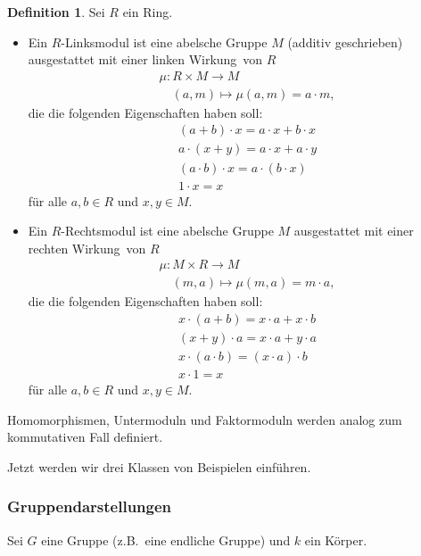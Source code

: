 \documentclass[reqno,12pt]{article}
\numberwithin{equation}{section}
\theoremstyle{plain}
\theoremstyle{definition}
\newtheorem{definition}[thm]{Definition}
\begin{document}
\begin{definition}
Sei $R$ ein Ring.
\begin{itemize}
  \item Ein {\sf $R$-Linksmodul} ist eine abelsche Gruppe $M$ (additiv geschrieben) ausgestattet mit einer linken \glqq Wirkung\grqq\, von $R$
  \begin{align*}
    & \mu \colon R \times M \to M \\
    & \quad  (a,m) \mapsto \mu(a,m) = a \cdot m,
  \end{align*}
  die die folgenden Eigenschaften haben soll:
  \begin{align*}
    & (a+b) \cdot x = a \cdot x + b \cdot x \\
    & a \cdot (x+y) = a \cdot x + a \cdot y \\
    & (a \cdot b) \cdot x = a \cdot (b \cdot x) \\
    & 1 \cdot x = x
  \end{align*}
  für alle $a,b \in R$ und $x,y \in M$.

  \item Ein {\sf $R$-Rechtsmodul} ist eine abelsche Gruppe $M$ ausgestattet mit einer rechten \glqq Wirkung\grqq\, von $R$
    \begin{align*}
      & \mu \colon M \times R \to M \\
      & \quad  (m,a) \mapsto \mu(m,a) = m \cdot a,
    \end{align*}
    die die folgenden Eigenschaften haben soll:
    \begin{align*}
      &   x \cdot (a+b) = x \cdot a + x \cdot b \\
      & (x+y) \cdot a   = x \cdot a + y \cdot a \\
      &  x \cdot (a \cdot b) = (x \cdot a) \cdot b \\
      & x \cdot 1 = x
    \end{align*}
    für alle $a,b \in R$ und $x,y \in M$.
\end{itemize}
Homomorphismen, Untermoduln und Faktormoduln werden analog zum kommutativen Fall definiert.
\end{definition}


Jetzt werden wir drei Klassen von Beispielen einführen.

\subsubsection{Gruppendarstellungen}

Sei $G$ eine Gruppe (z.B.\ eine endliche Gruppe) und $k$ ein Körper.
\end{document}
